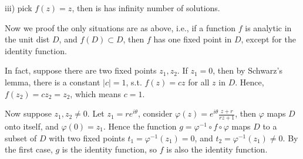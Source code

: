 \documentclass{article}%
\begin{document}
\begin{enumerate}
iii) pick $f(z) = z$, then is has infinity number of solutions.

Now we proof the only situations are as above, i.e., if a function $f$ is analytic in the unit dist $D$, and $f(D)\subset D$, then $f$ has one fixed point in $D$, except for the identity function.

In fact, suppose there are two fixed points $z_1, z_2 $. If $z_1 = 0$, then by Schwarz's lemma, there is a constant $|c| = 1$, s.t. $f(z) = cz$ for all $z$ in $D$. Hence, $f(z_2) = cz_2 = z_2 $, which means $c = 1$.

Now suppose $z_1, z_2\ne 0 $. Let $z_1 = re^{i\theta} $, consider $\varphi(z) = e^{i\theta}\frac{z+r}{rz+1}$, then $\varphi$ maps $D$ onto itself, and $\varphi(0) = z_1 $. Hence the function $g = \varphi^{-1} \circ f\circ\varphi$ maps $D$ to a subset of $D$ with two fixed points $t_1 = \varphi^{-1}(z_1) = 0 $, and $t_2 = \varphi^{-1}(z_1) \ne 0 $. By the first case, $g$ is the identity function, so $f$ is also the identity function.

\end{enumerate}
\end{document}
